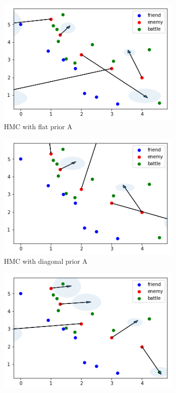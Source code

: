 \documentclass{article}
\begin{document}
\begin{figure}[h]
  \begin{subfigure}[b]{0.45\linewidth}
    \includegraphics[width=\linewidth]{Sampling31.png}
    \caption{HMC with flat prior A}
  \end{subfigure}
  \begin{subfigure}[b]{0.45\linewidth}
    \includegraphics[width=\linewidth]{Sampling32.png}
    \caption{HMC with diagonal prior A}
  \end{subfigure}
  \begin{subfigure}[b]{0.45\linewidth}
    \includegraphics[width=\linewidth]{Sampling41.png}

\end{subfigure}
\end{figure}
\end{document}
